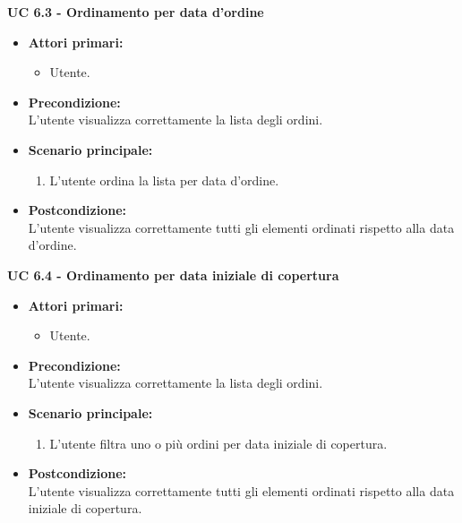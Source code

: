 \vspace{0.5cm}

\noindent \textbf{\large UC 6.3 - Ordinamento per data d'ordine }
\label{uc:ordinamento-data-ordine}
\begin{itemize}

	\item \textbf{Attori primari: }
		\begin{itemize}
			\item Utente.
		\end{itemize}

	\item \textbf{Precondizione: }\\[0.3cm]
		L'utente visualizza correttamente la lista degli ordini.

	\item \textbf{Scenario principale: }
		\begin{enumerate}
			\item L'utente ordina la lista per data d'ordine.
		\end{enumerate}
		

	\item \textbf{Postcondizione: }\\[0.3cm]
		L'utente visualizza correttamente tutti gli elementi ordinati rispetto alla data d'ordine.

\end{itemize}

\vspace{0.5cm}

\noindent \textbf{\large UC 6.4 - Ordinamento per data iniziale di copertura }
\label{uc:ordinamento-data-iniziale-copertura}
\begin{itemize}

	\item \textbf{Attori primari: }
		\begin{itemize}
			\item Utente.
		\end{itemize}

	\item \textbf{Precondizione: }\\[0.3cm]
		L'utente visualizza correttamente la lista degli ordini.

	\item \textbf{Scenario principale: }
		\begin{enumerate}
			\item L'utente filtra uno o più ordini per data iniziale di copertura.
		\end{enumerate}
		

	\item \textbf{Postcondizione: }\\[0.3cm]
		L'utente visualizza correttamente tutti gli elementi ordinati rispetto alla data iniziale di copertura.

\end{itemize}

